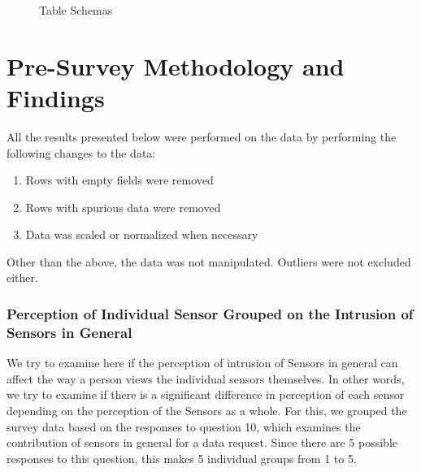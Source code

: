 \begin{figure}[htp]
\hspace{1em}
\caption{Table Schemas}
\label{fig:s3}
\end{figure}


\section{Pre-Survey Methodology and Findings}
All the results presented below were performed on the data by performing the following changes to the data:
\begin{enumerate}
\item Rows with empty fields were removed
\item Rows with spurious data were removed
\item Data was scaled or normalized when necessary
\end{enumerate}

Other than the above, the data was not manipulated. Outliers were not excluded either.

\subsubsection{Perception of Individual Sensor Grouped on the Intrusion of Sensors in General} \label{result:sensor}
We try to examine here if the perception of intrusion of Sensors in general can affect the way a person views the individual sensors themselves. In other
words, we try to examine if there is a significant difference in perception of each sensor depending on the perception of the Sensors as a whole.
For this, we grouped the survey data based on the responses to question 10, which examines the contribution of sensors in general for a data request. Since there are 5 possible responses to this question, this makes 5 individual groups from 1 to 5.

